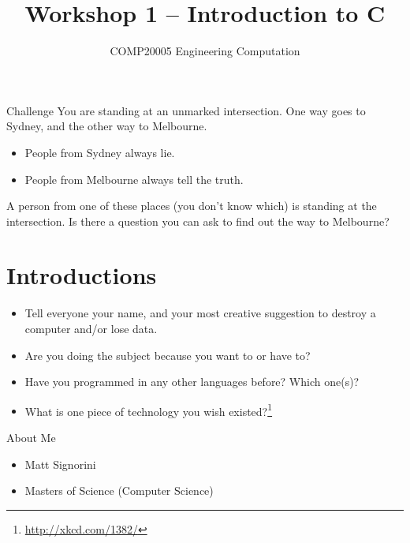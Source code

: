 \documentclass{beamer}
\title{Workshop 1 -- Introduction to C}
\author{COMP20005 Engineering Computation}
\institute{The University of Melbourne}
\begin{document}
\begin{frame}{Challenge}
    You are standing at an unmarked intersection. One way goes to Sydney, 
    and the other way to Melbourne.
    \begin{itemize}
        \item People from Sydney always lie.
        \item People from Melbourne always tell the truth.
    \end{itemize}
    A person from one of these places (you don't know which) is standing at
    the intersection. Is there a question you can ask to find out the way to
    Melbourne?
\end{frame}

\begin{frame}
    \titlepage
\end{frame}

\section{Introductions}

\begin{frame}{}
    \begin{itemize}
        \item Tell everyone your name, and your most creative suggestion to
            destroy a computer and/or lose data.
        \item Are you doing the subject because you want to or have to?
        \item Have you programmed in any other languages before? Which one(s)?
        \item What is one piece of technology you wish existed?\footnote{\url{http://xkcd.com/1382/}}
    \end{itemize}
\end{frame}

\begin{frame}{About Me}
    \begin{itemize}
        \item Matt Signorini
        \item Masters of Science (Computer Science)
    \end{itemize}
\end{frame}
\end{document}
